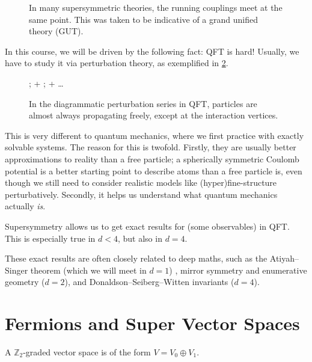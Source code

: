 \begin{figure}[tbhp]
  \centering
  \def\svgwidth{0.3\columnwidth}
  
  \caption{In many supersymmetric theories, the running couplings meet at the same point. This was taken to be indicative of a grand unified theory (GUT). }
  \label{fig:l1f1}
\end{figure}

In this course, we will be driven by the following fact: QFT is hard!
Usually, we have to study it via perturbation theory, as exemplified in \ref{fig:1}.
\begin{figure}[htbp]
  \centering
  ;
  \qquad + \qquad
  ;
  \qquad + \qquad \dots
  \caption{In the diagrammatic perturbation series in QFT, particles are almost always propagating freely, except at the interaction vertices.}
  \label{fig:1}
\end{figure}
This is very different to quantum mechanics, where we first practice with exactly solvable systems.
The reason for this is twofold. Firstly, they are usually better approximations to reality than a free particle; a spherically symmetric Coulomb potential is a better starting point to describe atoms than a free particle is, even though we still need to consider realistic models like (hyper)fine-structure perturbatively.
Secondly, it helps us understand what quantum mechanics actually \emph{is}.

Supersymmetry allows us to get exact results for (some observables) in QFT. This is especially true in $d < 4$, but also in $d = 4$.

These exact results are often closely related to deep maths, such as the Atiyah--Singer theorem (which we will meet in $d = 1$) , mirror symmetry and enumerative geometry ($d = 2$), and Donaldson--Seiberg--Witten invariants ($d = 4$).

\section{Fermions and Super Vector Spaces}%
\label{sec:fermions_and_super_vector_spaces}

\begin{definition}
  A $\mathbb{Z}_2$-graded vector space is of the form $V = V_0 \oplus V_1$.
\end{definition}

